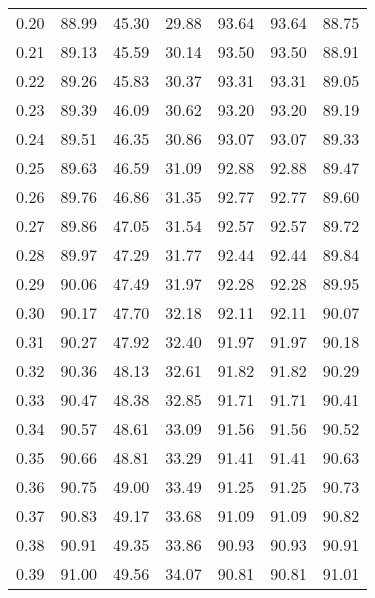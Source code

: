 \begin{tabular}{|c|c|c|c|c|c|c|}
      0.20 &     88.99 &     45.30 &      29.88 &   93.64 &      93.64 &         88.75 \\
      0.21 &     89.13 &     45.59 &      30.14 &   93.50 &      93.50 &         88.91 \\
      0.22 &     89.26 &     45.83 &      30.37 &   93.31 &      93.31 &         89.05 \\
      0.23 &     89.39 &     46.09 &      30.62 &   93.20 &      93.20 &         89.19 \\
      0.24 &     89.51 &     46.35 &      30.86 &   93.07 &      93.07 &         89.33 \\
      0.25 &     89.63 &     46.59 &      31.09 &   92.88 &      92.88 &         89.47 \\
      0.26 &     89.76 &     46.86 &      31.35 &   92.77 &      92.77 &         89.60 \\
      0.27 &     89.86 &     47.05 &      31.54 &   92.57 &      92.57 &         89.72 \\
      0.28 &     89.97 &     47.29 &      31.77 &   92.44 &      92.44 &         89.84 \\
      0.29 &     90.06 &     47.49 &      31.97 &   92.28 &      92.28 &         89.95 \\
      0.30 &     90.17 &     47.70 &      32.18 &   92.11 &      92.11 &         90.07 \\
      0.31 &     90.27 &     47.92 &      32.40 &   91.97 &      91.97 &         90.18 \\
      0.32 &     90.36 &     48.13 &      32.61 &   91.82 &      91.82 &         90.29 \\
      0.33 &     90.47 &     48.38 &      32.85 &   91.71 &      91.71 &         90.41 \\
      0.34 &     90.57 &     48.61 &      33.09 &   91.56 &      91.56 &         90.52 \\
      0.35 &     90.66 &     48.81 &      33.29 &   91.41 &      91.41 &         90.63 \\
      0.36 &     90.75 &     49.00 &      33.49 &   91.25 &      91.25 &         90.73 \\
      0.37 &     90.83 &     49.17 &      33.68 &   91.09 &      91.09 &         90.82 \\
      0.38 &     90.91 &     49.35 &      33.86 &   90.93 &      90.93 &         90.91 \\
      0.39 &     91.00 &     49.56 &      34.07 &   90.81 &      90.81 &         91.01 \\

\end{tabular}

